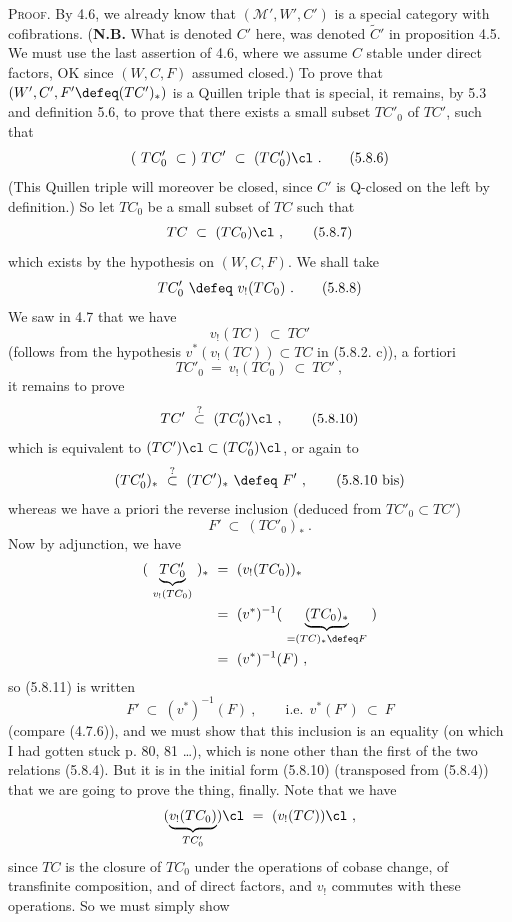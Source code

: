 \textsc{Proof}. By 4.6, we already know that $(\mathcal{M}', W', C')$ is a special category with cofibrations. (\textbf{N.B.} What is denoted $C'$ here, was denoted $\tilde{C}'$ in proposition 4.5. We must use the last assertion of 4.6, where we assume $C$ stable under direct factors, OK since $(W, C, F)$ assumed closed.) To prove that $(W', C', F' \defeq (TC')_*)$ is a Quillen triple
that is special, it remains, by 5.3 and definition 5.6, to prove that there exists a small subset $TC'_0$ of $TC'$, such that
\[
(\ TC'_0 \ \subset\ )\ TC' \ \subset \ (TC'_0)\cl\ .
\tag*{(5.8.6)}
\]
(This Quillen triple will moreover be closed, since $C'$ is Q-closed on the left by definition.) So let $TC_0$ be a small subset of $TC$ such that
\[
TC \ \subset \ (TC_0)\cl\ ,
\tag*{(5.8.7)}
\]
which exists by the hypothesis on $(W, C, F)$. We shall take
\[
TC'_0 \ \defeq \ v_!(TC_0)\ .
\tag*{(5.8.8)}
\]
We saw in 4.7 that we have
\[
v_!(TC) \ \subset \ TC'
\tag*{(5.8.9)}
\]
(follows from the hypothesis $v^*(v_!(TC)) \subset TC$ in (5.8.2. c)), a fortiori
\[
TC'_0 \ = \ v_!(TC_0) \ \subset \ TC'\ ,
\]
it remains to prove
\[
TC' \ \overset{?}{\subset} \ (TC'_0)\cl\ ,
\tag*{(5.8.10)}
\]
which is equivalent to $(TC')\cl \subset (TC'_0)\cl$, or again to
\[
(TC'_0)_* \ \overset{?}{\subset} \ (TC')_* \ \defeq \ F'\ ,
\tag*{(5.8.10 bis)}
\]
whereas we have a priori the reverse inclusion (deduced from $TC'_0 \subset TC'$)
\[
F' \ \subset \ (TC'_0)_*\ .
\tag*{(5.8.11)}
\]
Now by adjunction, we have
\[
\begin{aligned}
(\ \underbrace{TC'_0}_{v_!(TC_0)}\ )_* \ &= \ (v_!(TC_0))_*\\
&= \ (v^*)^{-1}(\ \underbrace{(TC_0)_*}_{= (TC)_* \defeq F}\ )\\
&= \ (v^*)^{-1}(F)\ ,
\end{aligned}
\]
so (5.8.11) is written
\[
F' \ \subset \ (v^*)^{-1}(F)\ , \qquad \text{i.e.}\ \ v^*(F') \ \subset \ F
\tag*{(5.8.12)}
\]
(compare (4.7.6)), and we must show that this inclusion is an equality (on which I had gotten stuck p. 80, 81 \ldots), which is none other than the first of the two relations (5.8.4). But it is in the initial form (5.8.10) (transposed from (5.8.4)) that we are going to prove the thing, finally. Note that we have
\[
(\underbrace{v_!(TC_0)}_{TC'_0})\cl \ = \ (v_!(TC))\cl\ ,
\]
since $TC$ is the closure of $TC_0$ under the operations of cobase change, of transfinite composition, and of direct factors, and $v_!$ commutes with these operations. So we must simply show
